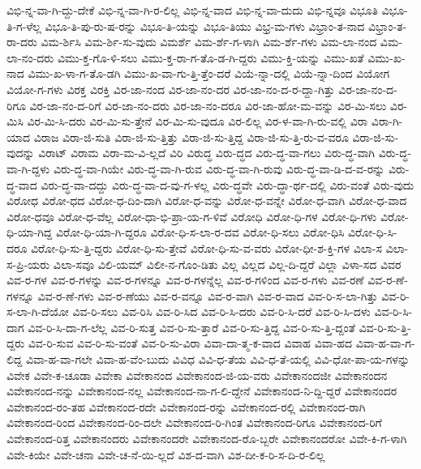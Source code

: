 {ವಿಭಿ-ನ್ನ-ವಾ-ಗಿ-ದ್ದು-ದೇಕೆ
ವಿಭಿ-ನ್ನ-ವಾ-ಗಿ-ರ-ಲಿಲ್ಲ
ವಿಭಿ-ನ್ನ-ವಾದ
ವಿಭಿ-ನ್ನ-ವಾ-ದುದು
ವಿಭಿ-ನ್ನವೂ
ವಿಭೂತಿ
ವಿಭೂ-ತಿ-ಗ-ಳೆಲ್ಲ
ವಿಭೂ-ತಿ-ಪು-ರು-ಷ-ರನ್ನು
ವಿಭೂ-ತಿ-ಯನ್ನು
ವಿಭೂ-ತಿಯು
ವಿಭ್ರ-ಮ-ಗಳು
ವಿಭ್ರಾಂ-ತ-ನಾದ
ವಿಭ್ರಾಂ-ತ-ರಾ-ದರು
ವಿಮ-ರ್ಶಿಸಿ
ವಿಮ-ರ್ಶಿ-ಸು-ವುದು
ವಿಮರ್ಶೆ
ವಿಮ-ರ್ಶೆ-ಗ-ಳಾಗಿ
ವಿಮ-ರ್ಶೆ-ಗಳು
ವಿಮ-ಲಾ-ನಂದ
ವಿಮ-ಲಾ-ನಂ-ದರು
ವಿಮು-ಕ್ತ-ಗೊ-ಳಿ-ಸಲು
ವಿಮು-ಕ್ತ-ರಾ-ಗ-ತೊ-ಡ-ಗಿ-ದ್ದರು
ವಿಮು-ಕ್ತಿ-ಯನ್ನು
ವಿಮು-ಖತೆ
ವಿಮು-ಖ-ನಾದ
ವಿಮು-ಖ-ಳಾ-ಗ-ತೊ-ಡಗಿ
ವಿಮು-ಖ-ವಾ-ಗು-ತ್ತಿ-ತ್ತೆಂ-ದರೆ
ವಿಯೆ-ನ್ನಾ-ದಲ್ಲಿ
ವಿಯೆ-ನ್ನಾ-ದಿಂದ
ವಿಯೋಗ
ವಿಯೋ-ಗ-ಗಳು
ವಿರಕ್ತ
ವಿರಕ್ತಿ
ವಿರ-ಜಾ-ನಂದ
ವಿರ-ಜಾ-ನಂ-ದರ
ವಿರ-ಜಾ-ನಂ-ದ-ರ-ದ್ದಾ-ಗಿತ್ತು
ವಿರ-ಜಾ-ನಂ-ದ-ರಿಗೂ
ವಿರ-ಜಾ-ನಂ-ದ-ರಿಗೆ
ವಿರ-ಜಾ-ನಂ-ದರು
ವಿರ-ಜಾ-ನಂ-ದರೂ
ವಿರ-ಜಾ-ಹೋ-ಮ-ವನ್ನು
ವಿರ-ಮಿ-ಸಲು
ವಿರ-ಮಿಸಿ
ವಿರ-ಮಿ-ಸಿ-ದರು
ವಿರ-ಮಿ-ಸು-ತ್ತೇನೆ
ವಿರ-ಮಿ-ಸು-ವುದೂ
ವಿರ-ಲಿಲ್ಲ
ವಿರ-ಳ-ವಾ-ಗಿ-ರು-ವಲ್ಲಿ
ವಿರಾ
ವಿರಾ-ಗಿ-ಯಾದ
ವಿರಾಜ
ವಿರಾ-ಜಿ-ಸುತಿ
ವಿರಾ-ಜಿ-ಸು-ತ್ತಿತ್ತು
ವಿರಾ-ಜಿ-ಸು-ತ್ತಿದ್ದ
ವಿರಾ-ಜಿ-ಸು-ತ್ತಿ-ರು-ವ-ವರೂ
ವಿರಾ-ಜಿ-ಸು-ವುದನ್ನು
ವಿರಾಟ್
ವಿರಾಮ
ವಿರಾ-ಮ-ವಿ-ಲ್ಲದೆ
ವಿರಿ
ವಿರುದ್ಧ
ವಿರು-ದ್ಧದ
ವಿರು-ದ್ಧ-ವಾ-ಗಲು
ವಿರು-ದ್ಧ-ವಾಗಿ
ವಿರು-ದ್ಧ-ವಾ-ಗಿ-ದ್ದಳು
ವಿರು-ದ್ಧ-ವಾ-ಗಿಯೇ
ವಿರು-ದ್ಧ-ವಾ-ಗಿ-ರುವ
ವಿರು-ದ್ಧ-ವಾ-ಗಿ-ರುವು
ವಿರು-ದ್ಧ-ವಾ-ಡಿ-ದ-ವ-ರನ್ನು
ವಿರು-ದ್ಧ-ವಾದ
ವಿರು-ದ್ಧ-ವಾ-ದದ್ದು
ವಿರು-ದ್ಧ-ವಾ-ದ-ವು-ಗ-ಳಲ್ಲ
ವಿರು-ದ್ಧವೇ
ವಿರು-ದ್ಧಾ-ರ್ಥ-ದಲ್ಲಿ
ವಿರು-ವಂತೆ
ವಿರು-ವುದು
ವಿರೋಧ
ವಿರೋ-ಧದ
ವಿರೋ-ಧ-ದಿಂ-ದಾಗಿ
ವಿರೋ-ಧ-ವನ್ನು
ವಿರೋ-ಧ-ವನ್ನೇ
ವಿರೋ-ಧ-ವಾಗಿ
ವಿರೋ-ಧ-ವಾದ
ವಿರೋ-ಧವೂ
ವಿರೋ-ಧ-ವೆಲ್ಲ
ವಿರೋ-ಧಾ-ಭಿ-ಪ್ರಾ-ಯ-ಗ-ಳಿವೆ
ವಿರೋಧಿ
ವಿರೋ-ಧಿ-ಗಳ
ವಿರೋ-ಧಿ-ಗಳು
ವಿರೋ-ಧಿ-ಯಾ-ಗಿದ್ದ
ವಿರೋ-ಧಿ-ಯಾ-ಗಿ-ದ್ದರೂ
ವಿರೋ-ಧಿ-ಸ-ಲಾ-ರ-ದವ
ವಿರೋ-ಧಿ-ಸಲು
ವಿರೋ-ಧಿಸಿ
ವಿರೋ-ಧಿ-ಸಿ-ದರೂ
ವಿರೋ-ಧಿ-ಸು-ತ್ತಿ-ದ್ದರು
ವಿರೋ-ಧಿ-ಸು-ತ್ತೇವೆ
ವಿರೋ-ಧಿ-ಸು-ವ-ವರು
ವಿರೋ-ಧೀ-ಶ-ಕ್ತಿ-ಗಳ
ವಿಲಾ-ಸ
ವಿಲಾ-ಸ-ಪ್ರಿ-ಯರು
ವಿಲಾ-ಸವೂ
ವಿಲಿ-ಯಮ್
ವಿಲೀ-ನ-ಗೊಂ-ಡಿತು
ವಿಲ್ಲ
ವಿಲ್ಲದ
ವಿಲ್ಲ-ದಿ-ದ್ದರೆ
ವಿಲ್ಲಾ
ವಿಳಾ-ಸದ
ವಿವರ
ವಿವ-ರ-ಗಳ
ವಿವ-ರ-ಗಳನ್ನು
ವಿವ-ರ-ಗಳನ್ನೂ
ವಿವ-ರ-ಗಳನ್ನೆಲ್ಲ
ವಿವ-ರ-ಗಳಿಂದ
ವಿವ-ರ-ಗಳು
ವಿವ-ರಣೆ
ವಿವ-ರ-ಣೆ-ಗಳನ್ನೂ
ವಿವ-ರ-ಣೆ-ಗಳು
ವಿವ-ರ-ಣೆಯು
ವಿವ-ರ-ವನ್ನೂ
ವಿವ-ರ-ವಾಗಿ
ವಿವ-ರ-ವಾದ
ವಿವ-ರಿ-ಸ-ಲಾ-ಗಿತ್ತು
ವಿವ-ರಿ-ಸ-ಲಾ-ಗಿ-ದೆಯೋ
ವಿವ-ರಿ-ಸಲು
ವಿವ-ರಿಸಿ
ವಿವ-ರಿ-ಸಿದ
ವಿವ-ರಿ-ಸಿ-ದರು
ವಿವ-ರಿ-ಸಿ-ದರೆ
ವಿವ-ರಿ-ಸಿ-ದಳು
ವಿವ-ರಿ-ಸಿ-ದಾಗ
ವಿವ-ರಿ-ಸಿ-ದಾ-ಗ-ಲೆಲ್ಲ
ವಿವ-ರಿ-ಸುತ್ತ
ವಿವ-ರಿ-ಸು-ತ್ತಾರೆ
ವಿವ-ರಿ-ಸು-ತ್ತಿದ್ದ
ವಿವ-ರಿ-ಸು-ತ್ತಿ-ದ್ದಂತೆ
ವಿವ-ರಿ-ಸು-ತ್ತಿ-ದ್ದರು
ವಿವ-ರಿ-ಸುವ
ವಿವ-ರಿ-ಸು-ವಂತೆ
ವಿವ-ರಿ-ಸು-ವಿರಾ
ವಿವಾ-ದಾ-ತ್ಮ-ಕ-ವಾದ
ವಿವಾಹ
ವಿವಾ-ಹದ
ವಿವಾ-ಹ-ವಾ-ಗ-ಲಿದ್ದ
ವಿವಾ-ಹ-ವಾ-ಗಲೇ
ವಿವಾ-ಹ-ವೆಂ-ಬುದು
ವಿವಿಧ
ವಿವಿ-ಧ-ತೆಯ
ವಿವಿ-ಧ-ತೆ-ಯಲ್ಲಿ
ವಿವಿ-ಧೋ-ಪಾ-ಯ-ಗಳನ್ನು
ವಿವೇಕ
ವಿವೇ-ಕ-ಚೂಡಾ
ವಿವೇಕಾ
ವಿವೇಕಾನಂದ
ವಿವೇಕಾನಂದ-ಜಿ-ಯ-ವರು
ವಿವೇಕಾನಂದಜೀ
ವಿವೇಕಾನಂದನ
ವಿವೇಕಾನಂದ-ನನ್ನು
ವಿವೇಕಾನಂದ-ನಲ್ಲ
ವಿವೇಕಾನಂದ-ನಾ-ಗ-ಲಿ-ದ್ದೇನೆ
ವಿವೇಕಾನಂದ-ನಿ-ದ್ದಿ-ದ್ದರೆ
ವಿವೇಕಾನಂದರ
ವಿವೇಕಾನಂದ-ರಂ-ತಹ
ವಿವೇಕಾನಂದ-ರದೇ
ವಿವೇಕಾನಂದ-ರನ್ನು
ವಿವೇಕಾನಂದ-ರಲ್ಲಿ
ವಿವೇಕಾನಂದ-ರಾಗಿ
ವಿವೇಕಾನಂದ-ರಿಂದ
ವಿವೇಕಾನಂದ-ರಿಂ-ದಲೇ
ವಿವೇಕಾನಂದ-ರಿ-ಗಿಂತ
ವಿವೇಕಾನಂದ-ರಿಗೂ
ವಿವೇಕಾನಂದ-ರಿಗೆ
ವಿವೇಕಾನಂದ-ರಿತ್ತ
ವಿವೇಕಾನಂದರು
ವಿವೇಕಾನಂದರೇ
ವಿವೇಕಾನಂದ-ರೊ-ಬ್ಬರೇ
ವಿವೇಕಾನಂದರೋ
ವಿವೇ-ಕಿ-ಗ-ಳಾಗಿ
ವಿವೇ-ಕಿಯೇ
ವಿವೇ-ಚನಾ
ವಿವೇ-ಚ-ನೆ-ಯಿ-ಲ್ಲದೆ
ವಿಶ-ದ-ವಾಗಿ
ವಿಶ-ದೀ-ಕ-ರಿ-ಸ-ದಿ-ರ-ಲಿಲ್ಲ
}
